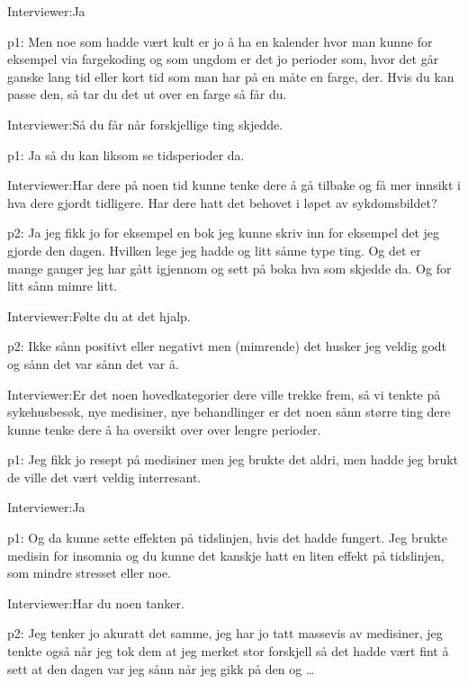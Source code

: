 \documentclass[11pt, norsk, a4paper]{article}
\begin{document}
\textcolor{myBlue} {Interviewer:}Ja

\textcolor{myGreen} {p1:} Men noe som hadde vært kult er jo å ha en kalender hvor man kunne for eksempel via fargekoding og som ungdom er det jo perioder som, hvor det går ganske lang tid eller kort tid som man har på en måte en farge, der. Hvis du kan passe den, så tar du det ut over en farge så får du.

\textcolor{myBlue} {Interviewer:}Så du får når forskjellige ting skjedde. 

\textcolor{myGreen} {p1:} Ja så du kan liksom se tidsperioder da.

\textcolor{myBlue} {Interviewer:}Har dere på noen tid kunne tenke dere å gå tilbake og få mer innsikt i hva dere gjordt tidligere. Har dere hatt det behovet i løpet av sykdomsbildet?

\textcolor{myYellow} {p2:} Ja jeg fikk jo for eksempel en bok jeg kunne skriv inn for eksempel det jeg gjorde den dagen. Hvilken lege jeg hadde og litt sånne type ting. Og det er mange ganger jeg har gått igjennom og sett på boka hva som skjedde da. Og for litt sånn mimre litt. 

\textcolor{myBlue} {Interviewer:}Følte du at det hjalp.

\textcolor{myYellow} {p2:} Ikke sånn positivt eller negativt men (mimrende) det husker jeg veldig godt og sånn det var sånn det var å.

\textcolor{myBlue} {Interviewer:}Er det noen hovedkategorier dere ville trekke frem, så vi tenkte på sykehusbesøk, nye medisiner, nye behandlinger er det noen sånn større ting dere kunne tenke dere å ha oversikt over over lengre perioder.

\textcolor{myGreen} {p1:} Jeg fikk jo resept på medisiner men jeg brukte det aldri, men hadde jeg brukt de ville det vært veldig interresant.

\textcolor{myBlue} {Interviewer:}Ja

\textcolor{myGreen} {p1:} Og da kunne sette effekten på tidslinjen, hvis det hadde fungert. Jeg brukte medisin for insomnia og du kunne det kanskje hatt en liten effekt på tidslinjen, som mindre stresset eller noe.

\textcolor{myBlue} {Interviewer:}Har du noen tanker.

\textcolor{myYellow} {p2:} Jeg tenker jo akuratt det samme, jeg har jo tatt massevis av medisiner, jeg tenkte også når jeg tok dem at jeg merket stor forskjell så det hadde vært fint å sett at den dagen var jeg sånn når jeg gikk på den og \dots
\end{document}
